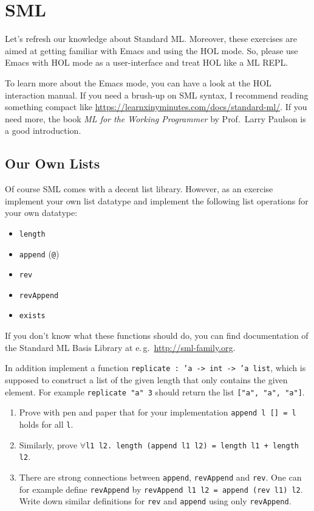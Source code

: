 \documentclass[a4paper,10pt,oneside]{scrartcl}
\begin{document}
\section{SML}

Let's refresh our knowledge about Standard ML. Moreover, these
exercises are aimed at getting familiar with Emacs and using the HOL
mode. So, please use Emacs with HOL mode as a user-interface and treat
HOL like a ML REPL.

To learn more about the Emacs mode, you can have a look at the HOL interaction manual.
If you need a brush-up on SML syntax, I recommend reading something compact like
\url{https://learnxinyminutes.com/docs/standard-ml/}. If you need more, the book
\emph{ML for the Working Programmer} by Prof.\ Larry Paulson is a good introduction.

\subsection{Our Own Lists}

Of course SML comes with a decent list library. However, as an exercise implement your own list datatype and implement the following list operations for your own datatype:
%
\begin{itemize}
\item \texttt{length}
\item \texttt{append} (\texttt{@})
\item \texttt{rev}
\item \texttt{revAppend}
\item \texttt{exists}
\end{itemize}
%
If you don't know what these functions should do, you can find documentation of the Standard ML Basis Library at e.\,g.\ \url{http://sml-family.org}. 

In addition implement a function \texttt{replicate\ :\ 'a -> int -> 'a list}, which is supposed to
construct a list of the given length that only contains the given element. For example \texttt{replicate "a" 3} should return the list \texttt{["a", "a", "a"]}.   

\begin{enumerate}
\item Prove with pen and paper that for your implementation 
  \texttt{append l [] = l} holds for all \texttt{l}.
\item Similarly, prove \texttt{$\forall$l1 l2.\ length (append l1 l2) = length l1 + length l2}.
\item There are strong connections between \texttt{append}, \texttt{revAppend} and \texttt{rev}.
One can for example define \texttt{revAppend} by \texttt{revAppend l1 l2 = append (rev l1) l2}.
Write down similar definitions for \texttt{rev} and \texttt{append} using only \texttt{revAppend}. 
\end{enumerate}
\end{document}
